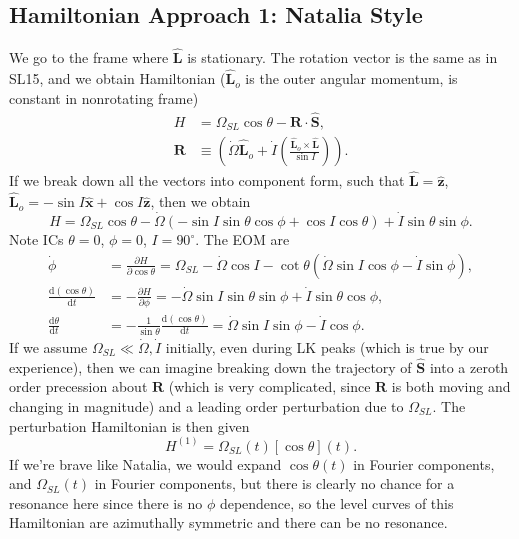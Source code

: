 \documentclass[11pt,
        usenames, %
        dvipsnames %
    ]{article}
\newcommand*{\rd}[2]{\frac{\mathrm{d}#1}{\mathrm{d}#2}}
\newcommand*{\pd}[2]{\frac{\partial#1}{\partial#2}}
\newcommand*{\bm}[1]{\boldsymbol{\mathbf{#1}}}
\newcommand*{\uv}[1]{\hat{\bm{#1}}}
\newcommand*{\p}[1]{\left(#1\right)}
\newcommand*{\s}[1]{\left[#1\right]}
\begin{document}
\subsection{Hamiltonian Approach 1: Natalia Style}

We go to the frame where $\uv{L}$ is stationary. The rotation vector is the
same as in SL15, and we obtain Hamiltonian ($\uv{L}_o$ is the outer angular
momentum, is constant in nonrotating frame)
\begin{align}
    H &= \Omega_{SL}\cos \theta - \bm{R} \cdot \uv{S},\\
    \bm{R} &\equiv \p{\dot{\Omega} \uv{L}_{o}
        + \dot{I}\p{\frac{\uv{L}_{o} \times \uv{L}}{\sin I}}}.
\end{align}
If we break down all the vectors into component form, such that $\uv{L} =
\uv{z}$, $\uv{L}_{o} = -\sin I \uv{x} + \cos I \uv{z}$, then we obtain
\begin{equation}
    H = \Omega_{SL}\cos \theta - \dot{\Omega}
        \p{-\sin I \sin \theta \cos \phi + \cos I \cos \theta}
        + \dot{I}\sin \theta \sin \phi.
\end{equation}
Note ICs $\theta = 0$, $\phi = 0$, $I = 90^\circ$. The EOM are
\begin{align}
    \dot{\phi} &= \pd{H}{\cos \theta} = \Omega_{SL} - \dot{\Omega}\cos I
        - \cot \theta\p{\dot{\Omega} \sin I \cos \phi - \dot{I}\sin \phi},\\
    \rd{(\cos \theta)}{t} &= -\pd{H}{\phi} =
        -\dot{\Omega} \sin I \sin \theta \sin \phi
        + \dot{I}\sin \theta \cos \phi,\\
    \rd{\theta}{t} &= -\frac{1}{\sin \theta}\rd{(\cos \theta)}{t}
        = \dot{\Omega}\sin I \sin \phi - \dot{I}\cos \phi.
\end{align}
If we assume $\Omega_{SL} \ll \dot{\Omega}, \dot{I}$ initially, even during LK
peaks (which is true by our experience), then we can imagine breaking down the
trajectory of $\uv{S}$ into a zeroth order precession about $\bm{R}$ (which is
very complicated, since $\bm{R}$ is both moving and changing in magnitude) and a
leading order perturbation due to $\Omega_{SL}$. The perturbation Hamiltonian is
then given
\begin{equation}
    H^{(1)} = \Omega_{SL}(t) \s{\cos \theta}(t).
\end{equation}
If we're brave like Natalia, we would expand $\cos \theta(t)$ in Fourier
components, and $\Omega_{SL}(t)$ in Fourier components, but there is clearly no
chance for a resonance here since there is no $\phi$ dependence, so the level
curves of this Hamiltonian are azimuthally symmetric and there can be no
resonance.
\end{document}
